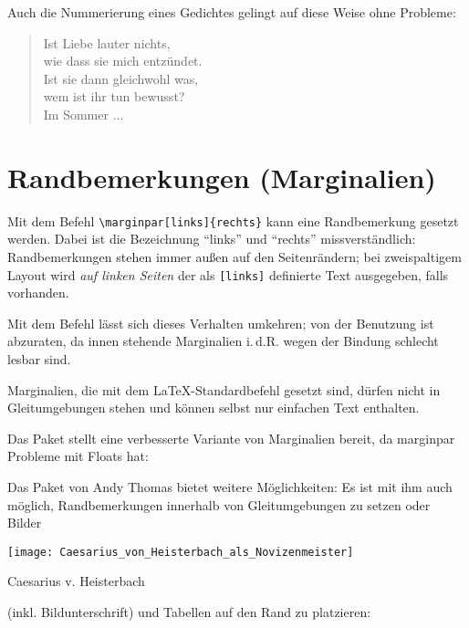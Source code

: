  


Auch die Nummerierung eines Gedichtes gelingt auf diese Weise ohne Probleme:

\begin{LTXexample}
 \begin{verse}
  \modulolinenumbers[5]
  \linenumbers
  Ist Liebe lauter nichts,\\
  wie dass sie mich entzündet.\\
  Ist sie dann gleichwohl was,\\
  wem ist ihr tun bewusst?\\
  
  Im Sommer ...\\
 \end{verse}

\end{LTXexample}



\section{Randbemerkungen (Marginalien)}

Mit dem Befehl \lstinline/\marginpar[links]{rechts}/ kann eine Randbemerkung gesetzt werden.
Dabei ist die Bezeichnung \enquote{links} und \enquote{rechts} missverständlich: 
Randbemerkungen stehen immer außen auf den Seitenrändern; bei zweispaltigem Layout wird 
\emph{auf linken Seiten} der als \lstinline/[links]/ definierte Text ausgegeben, falls vorhanden.

Mit dem Befehl  lässt sich dieses Verhalten umkehren; 
von der Benutzung ist abzuraten, da innen stehende Marginalien i.\,d.R. wegen der Bindung schlecht
lesbar sind.

Marginalien, die mit dem \LaTeX -Standardbefehl gesetzt sind, dürfen nicht in Gleitumgebungen
stehen und können selbst nur einfachen Text enthalten.


Das Paket  stellt eine verbesserte Variante von Marginalien bereit, 
da marginpar Probleme mit Floats hat:

Das Paket  von Andy Thomas bietet weitere Möglichkeiten: 
Es ist mit ihm auch möglich, Randbemerkungen innerhalb von Gleitumgebungen zu setzen oder
Bilder
\begin{marginfigure}
 \texttt{[image: Caesarius\_von\_Heisterbach\_als\_Novizenmeister]}
 \caption{Caesarius v. Heisterbach}
\end{marginfigure}
(inkl. Bildunterschrift) und Tabellen auf den Rand zu platzieren:

